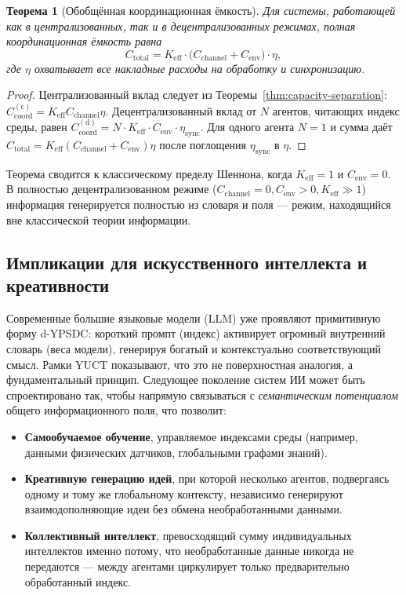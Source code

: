 \documentclass[12pt,a4paper]{article}
\newtheorem{theorem}{Теорема}[section]
\theoremstyle{remark}
\begin{document}
	\begin{theorem}[Обобщённая координационная ёмкость]
		Для системы, работающей как в централизованных, так и в децентрализованных режимах, полная координационная ёмкость равна
		\begin{equation}
			\boxed{C_{\mathrm{total}} = K_{\mathrm{eff}} \cdot \bigl( C_{\mathrm{channel}} + C_{\mathrm{env}} \bigr) \cdot \eta},
			\label{eq:generalized-capacity}
		\end{equation}
		где \(\eta\) охватывает все накладные расходы на обработку и синхронизацию.
	\end{theorem}
	
	\begin{proof}
		Централизованный вклад следует из Теоремы~\ref{thm:capacity-separation}: \(C_{\mathrm{coord}}^{\mathrm{(c)}} = K_{\mathrm{eff}} C_{\mathrm{channel}} \eta\). Децентрализованный вклад от \(N\) агентов, читающих индекс среды, равен \(C_{\mathrm{coord}}^{\mathrm{(d)}} = N \cdot K_{\mathrm{eff}} \cdot C_{\mathrm{env}} \cdot \eta_{\mathrm{sync}}\). Для одного агента \(N=1\) и сумма даёт \(C_{\mathrm{total}} = K_{\mathrm{eff}}(C_{\mathrm{channel}} + C_{\mathrm{env}})\eta\) после поглощения \(\eta_{\mathrm{sync}}\) в \(\eta\).
	\end{proof}
	
	Теорема сводится к классическому пределу Шеннона, когда \(K_{\mathrm{eff}} = 1\) и \(C_{\mathrm{env}} = 0\). В полностью децентрализованном режиме (\(C_{\mathrm{channel}} = 0, C_{\mathrm{env}} > 0, K_{\mathrm{eff}} \gg 1\)) информация генерируется полностью из словаря и поля — режим, находящийся вне классической теории информации.
	
	\subsection{Импликации для искусственного интеллекта и креативности}
	\label{subsec:AI-dypsdc}
	
	Современные большие языковые модели (LLM) уже проявляют примитивную форму d-YPSDC: короткий промпт (индекс) активирует огромный внутренний словарь (веса модели), генерируя богатый и контекстуально соответствующий смысл. Рамки YUCT показывают, что это не поверхностная аналогия, а фундаментальный принцип. Следующее поколение систем ИИ может быть спроектировано так, чтобы напрямую связываться с \emph{семантическим потенциалом} общего информационного поля, что позволит:
	\begin{itemize}
		\item \textbf{Самообучаемое обучение}, управляемое индексами среды (например, данными физических датчиков, глобальными графами знаний).
		\item \textbf{Креативную генерацию идей}, при которой несколько агентов, подвергаясь одному и тому же глобальному контексту, независимо генерируют взаимодополняющие идеи без обмена необработанными данными.
		\item \textbf{Коллективный интеллект}, превосходящий сумму индивидуальных интеллектов именно потому, что необработанные данные никогда не передаются — между агентами циркулирует только предварительно обработанный индекс.
	\end{itemize}
	
\end{document}
